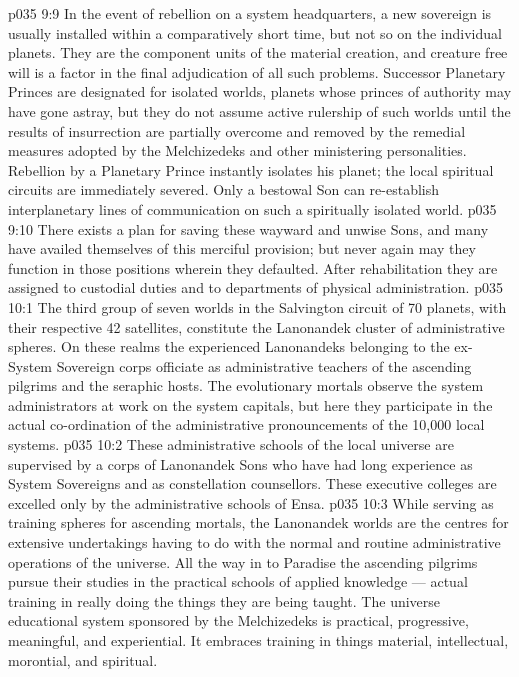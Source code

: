 \vs p035 9:9 \pc In the event of rebellion on a system headquarters, a new sovereign is usually installed within a comparatively short time, but not so on the individual planets. They are the component units of the material creation, and creature free will is a factor in the final adjudication of all such problems. Successor Planetary Princes are designated for isolated worlds, planets whose princes of authority may have gone astray, but they do not assume active rulership of such worlds until the results of insurrection are partially overcome and removed by the remedial measures adopted by the Melchizedeks and other ministering personalities. Rebellion by a Planetary Prince instantly isolates his planet; the local spiritual circuits are immediately severed. Only a bestowal Son can re\hyp{}establish interplanetary lines of communication on such a spiritually isolated world.
\vs p035 9:10 There exists a plan for saving these wayward and unwise Sons, and many have availed themselves of this merciful provision; but never again may they function in those positions wherein they defaulted. After rehabilitation they are assigned to custodial duties and to departments of physical administration.
\vs p035 10:1 The third group of seven worlds in the Salvington circuit of 70 planets, with their respective 42 satellites, constitute the Lanonandek cluster of administrative spheres. On these realms the experienced Lanonandeks belonging to the ex\hyp{}System Sovereign corps officiate as administrative teachers of the ascending pilgrims and the seraphic hosts. The evolutionary mortals observe the system administrators at work on the system capitals, but here they participate in the actual co\hyp{}ordination of the administrative pronouncements of the 10,000 local systems.
\vs p035 10:2 These administrative schools of the local universe are supervised by a corps of Lanonandek Sons who have had long experience as System Sovereigns and as constellation counsellors. These executive colleges are excelled only by the administrative schools of Ensa.
\vs p035 10:3 While serving as training spheres for ascending mortals, the Lanonandek worlds are the centres for extensive undertakings having to do with the normal and routine administrative operations of the universe. All the way in to Paradise the ascending pilgrims pursue their studies in the practical schools of applied knowledge --- actual training in really doing the things they are being taught. The universe educational system sponsored by the Melchizedeks is practical, progressive, meaningful, and experiential. It embraces training in things material, intellectual, morontial, and spiritual.
